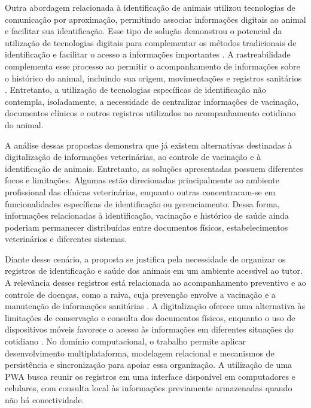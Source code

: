 \documentclass{UNESC}
\begin{document}
Outra abordagem relacionada à identificação de animais utilizou tecnologias de comunicação por aproximação, permitindo associar informações digitais ao animal e facilitar sua identificação. Esse tipo de solução demonstrou o potencial da utilização de tecnologias digitais para complementar os métodos tradicionais de identificação e facilitar o acesso a informações importantes \cite{sartori2018}. A rastreabilidade complementa esse processo ao permitir o acompanhamento de informações sobre o histórico do animal, incluindo sua origem, movimentações e registros sanitários \cite{zhao2020}. Entretanto, a utilização de tecnologias específicas de identificação não contempla, isoladamente, a necessidade de centralizar informações de vacinação, documentos clínicos e outros registros utilizados no acompanhamento cotidiano do animal.

A análise dessas propostas demonstra que já existem alternativas destinadas à digitalização de informações veterinárias, ao controle de vacinação e à identificação de animais. Entretanto, as soluções apresentadas possuem diferentes focos e limitações. Algumas estão direcionadas principalmente ao ambiente profissional das clínicas veterinárias, enquanto outras concentraram-se em funcionalidades específicas de identificação ou gerenciamento. Dessa forma, informações relacionadas à identificação, vacinação e histórico de saúde ainda poderiam permanecer distribuídas entre documentos físicos, estabelecimentos veterinários e diferentes sistemas.

Diante desse cenário, a proposta se justifica pela necessidade de organizar os registros de identificação e saúde dos animais em um ambiente acessível ao tutor. A relevância desses registros está relacionada ao acompanhamento preventivo e ao controle de doenças, como a raiva, cuja prevenção envolve a vacinação e a manutenção de informações sanitárias \cite{MOUTINHO2017,murphy2008}. A digitalização oferece uma alternativa às limitações de conservação e consulta dos documentos físicos, enquanto o uso de dispositivos móveis favorece o acesso às informações em diferentes situações do cotidiano \cite{VIEIRA2020,RODRIGUES2022}. No domínio computacional, o trabalho permite aplicar desenvolvimento multiplataforma, modelagem relacional e mecanismos de persistência e sincronização para apoiar essa organização. A utilização de uma PWA busca reunir os registros em uma interface disponível em computadores e celulares, com consulta local às informações previamente armazenadas quando não há conectividade.
\end{document}
